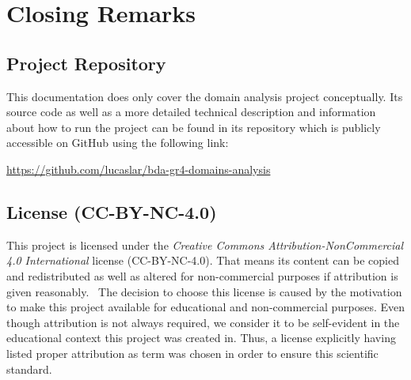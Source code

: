 \section{Closing Remarks}\label{sec:closing-remarks}

\subsection{Project Repository}\label{subsec:project-repository}

This documentation does only cover the domain analysis project conceptually.
Its source code as well as a more detailed technical description and information about how to run the project can be found in its repository which is publicly accessible on GitHub using the following link:

\url{https://github.com/lucaslar/bda-gr4-domains-analysis}

\subsection{License (CC-BY-NC-4.0)}\label{subsec:license}

This project is licensed under the \textit{Creative Commons Attribution-NonCommercial 4.0 International} license (CC-BY-NC-4.0).
That means its content can be copied and redistributed as well as altered for non-commercial purposes if attribution is given reasonably.~\autocite[cf.][]{CreativeCommons.2021}
The decision to choose this license is caused by the motivation to make this project available for educational and non-commercial purposes.
Even though attribution is not always required, we consider it to be self-evident in the educational context this project was created in.
Thus, a license explicitly having listed proper attribution as term was chosen in order to ensure this scientific standard.
